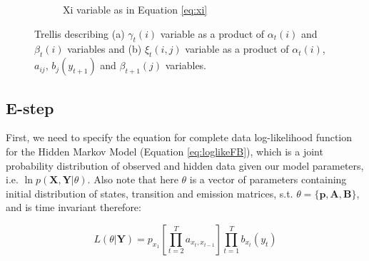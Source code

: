 \begin{figure}[htbp]
\begin{subfigure}{.5\textwidth}
    \caption{Xi variable as in Equation \ref{eq:xi}}
    \end{subfigure}
\caption{Trellis describing (a) $\gamma_t(i)$ variable as a product of $\alpha_t(i)$ and $\beta_t(i)$ variables and 
                            (b) $\xi_t(i,j)$ variable as a product of $\alpha_t(i)$, $a_{ij}$, $b_j(y_{t+1})$ and $\beta_{t+1}(j)$ variables.}
\end{figure}

\subsection*{E-step}

First, we need to specify the equation for complete data log-likelihood function for the Hidden Markov Model (Equation \ref{eq:loglikeFB}), which is a joint probability distribution of observed and 
hidden data given our model parameters, i.e. $\ln p(\textbf{X},\textbf{Y}|\theta)$. Also note that here $\theta$ is a vector of parameters containing initial 
distribution of states, transition and emission matrices, s.t. $\theta = \{\textbf{p}, \textbf{A}, \textbf{B}\}$, and is time invariant therefore:

\begin{equation}
    L(\theta|\textbf{Y}) = p_{x_1} \left[ \prod_{t=2}^{T} a_{x_t,x_{t-1}} \right] \prod_{t=1}^{T} b_{x_t}(y_t)
\end{equation}

